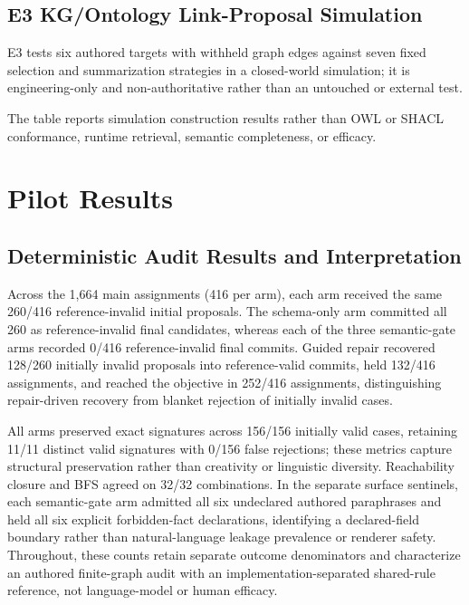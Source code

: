 \documentclass[journal]{IEEEtran}
\begin{document}
\subsection{\textbf{E3} KG/Ontology Link-Proposal Simulation}
E3 tests six authored targets with withheld graph edges against seven fixed selection and summarization strategies in a closed-world simulation; it is engineering-only and non-authoritative rather than an untouched or external test.

The table reports simulation construction results rather than OWL or SHACL conformance, runtime retrieval, semantic completeness, or efficacy.
\section{Pilot Results}\label{sec:results}




\subsection{Deterministic Audit Results and Interpretation}\label{sec:review-boundary-results}
Across the 1,664 main assignments (416 per arm), each arm received the same 260/416 reference-invalid initial proposals. The schema-only arm committed all 260 as reference-invalid final candidates, whereas each of the three semantic-gate arms recorded 0/416 reference-invalid final commits. Guided repair recovered 128/260 initially invalid proposals into reference-valid commits, held 132/416 assignments, and reached the objective in 252/416 assignments, distinguishing repair-driven recovery from blanket rejection of initially invalid cases.

All arms preserved exact signatures across 156/156 initially valid cases, retaining 11/11 distinct valid signatures with 0/156 false rejections; these metrics capture structural preservation rather than creativity or linguistic diversity. Reachability closure and BFS agreed on 32/32 combinations. In the separate surface sentinels, each semantic-gate arm admitted all six undeclared authored paraphrases and held all six explicit forbidden-fact declarations, identifying a declared-field boundary rather than natural-language leakage prevalence or renderer safety. Throughout, these counts retain separate outcome denominators and characterize an authored finite-graph audit with an implementation-separated shared-rule reference, not language-model or human efficacy.

\end{document}
